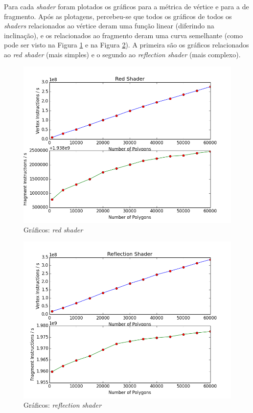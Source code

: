 	Para cada \textit{shader} foram plotados os gráficos para a métrica de vértice e para a de fragmento. Após as plotagens, percebeu-se que todos os gráficos de todos os \textit{shaders} relacionados ao vértice deram uma função linear (diferindo na inclinação), e os relacionados ao fragmento deram uma curva semelhante (como pode ser visto na Figura \ref{plotred} e na Figura \ref{plotrefl}). A primeira são os gráficos relacionados ao \textit{ red shader} (mais simples) e o segundo ao \textit{reflection shader} (mais complexo). 

	\begin{figure}[h]
	\centering
		\includegraphics[keepaspectratio=true,scale=0.6]{figuras/red.png}
	\caption{Gráficos: \textit{red shader}}
	\label{plotred}
	\end{figure}

	\begin{figure}[h]
	\centering
		\includegraphics[keepaspectratio=true,scale=0.6]{figuras/reflectionplot.png}
	\caption{Gráficos: \textit{reflection shader}}
	\label{plotrefl}
	\end{figure}	


